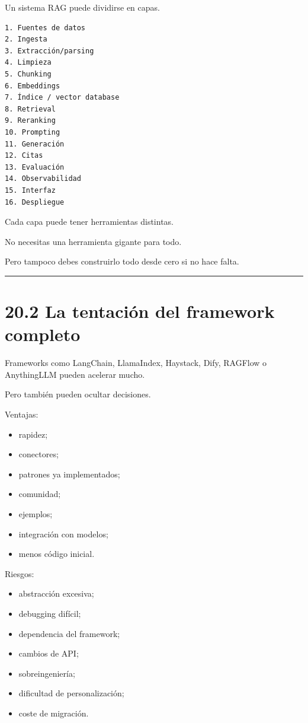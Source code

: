 Un sistema RAG puede dividirse en capas.

\begin{lstlisting}
1. Fuentes de datos
2. Ingesta
3. Extracción/parsing
4. Limpieza
5. Chunking
6. Embeddings
7. Índice / vector database
8. Retrieval
9. Reranking
10. Prompting
11. Generación
12. Citas
13. Evaluación
14. Observabilidad
15. Interfaz
16. Despliegue
\end{lstlisting}

Cada capa puede tener herramientas distintas.

No necesitas una herramienta gigante para todo.

Pero tampoco debes construirlo todo desde cero si no hace falta.

\begin{center}\rule{0.5\linewidth}{0.5pt}\end{center}

\section{20.2 La tentación del framework
completo}\label{la-tentaciuxf3n-del-framework-completo}

Frameworks como LangChain, LlamaIndex, Haystack, Dify, RAGFlow o
AnythingLLM pueden acelerar mucho.

Pero también pueden ocultar decisiones.

Ventajas:

\begin{itemize}
\tightlist
\item
  rapidez;
\item
  conectores;
\item
  patrones ya implementados;
\item
  comunidad;
\item
  ejemplos;
\item
  integración con modelos;
\item
  menos código inicial.
\end{itemize}

Riesgos:

\begin{itemize}
\tightlist
\item
  abstracción excesiva;
\item
  debugging difícil;
\item
  dependencia del framework;
\item
  cambios de API;
\item
  sobreingeniería;
\item
  dificultad de personalización;
\item
  coste de migración.
\end{itemize}

